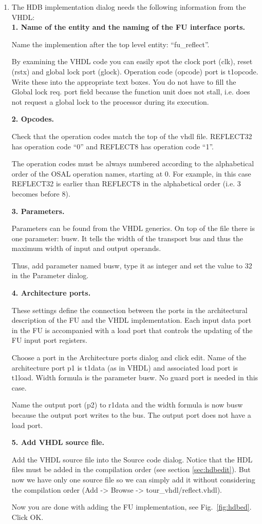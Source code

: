 \documentclass[twoside]{tceusermanual}
\begin{document}
\begin{enumerate}
\item%
The HDB implementation dialog needs the following information from the VHDL:\\

\textbf{1. Name of the entity and the naming of the FU interface ports.}

Name the implemention after the top level entity: ``fu\_reflect''.

By examining the VHDL code you can easily spot the clock port (clk),
reset (rstx) and global lock port (glock). Operation code (opcode)
port is t1opcode. Write these into the appropriate text boxes. You do
not have to fill the Global lock req. port field because the function
unit does not stall, i.e. does not request a global lock to the
processor during its execution.

\textbf{2. Opcodes.}

Check that the operation codes match the top of the vhdl file. REFLECT32
has operation code ``0'' and REFLECT8 has operation code ``1''. 

The operation codes must be always numbered according to the alphabetical order of 
the OSAL operation names, starting at 0. For example, in this case REFLECT32 is 
earlier than REFLECT8 in the alphabetical order (i.e. 3 becomes before 8).

\textbf{3. Parameters.}

Parameters can be found from the VHDL generics. On top of the file there is one
parameter: busw. It tells the width of the transport bus and thus the maximum
width of input and output operands.

Thus, add parameter named busw, type it as integer and set the value to 32 in the
Parameter dialog.

\textbf{4. Architecture ports.}

These settings define the connection between the ports in the
architectural description of the FU and the VHDL implementation.
Each input data port in the FU is accompanied with a load port that
controls the updating of the FU input port registers.

Choose a port in the Architecture ports dialog and click edit.  Name
of the architecture port p1 is t1data (as in VHDL) and associated load
port is t1load.  Width formula is the parameter busw. No guard port is
needed in this case.

Name the output port (p2) to r1data and the width formula is now busw
because the output port writes to the bus.
The output port does not have a load port.

\textbf{5. Add VHDL source file.}

Add the VHDL source file into the Source code dialog. Notice that the HDL
files must be added in the compilation order (see section \ref{sec:hdbedit}).
But now we have only one source file so we can simply add it without
considering the compilation order (Add -> Browse -> tour\_vhdl/reflect.vhdl).

Now you are done with adding the FU implementation, see Fig.~\ref{fig:hdbed}. Click OK.

\end{enumerate}
\end{document}
